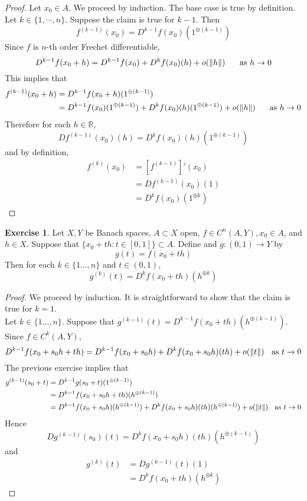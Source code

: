 \documentclass[12pt]{amsart}
\theoremstyle{definition}
\newtheorem{ex}[definition]{Exercise}
\newcommand{\R}{\mathbb{R}}
\newcommand{\lex}[1]{\label{ex:#1}}
\begin{document}
	\begin{proof}
	Let $x_0 \in A$. We proceed by induction. The base case is true by definition. Let $k \in \{1, \cdots, n\}$. Suppose the claim is true for $k-1$. Then $$f^{(k-1)}(x_0) = D^{k-1}f(x_0)(1^{\oplus (k-1)})$$
	Since $f$ is $n$-th order Frechet differentiable, $$D^{k-1}f(x_0+h) = D^{k-1}f(x_0) + D^kf(x_0)(h) + o(\|h\|) \hspace{.5cm} \text{ as } h \rightarrow 0$$ 
	This implies that 
	\begin{align*}
	f^{(k-1)}(x_0+h) 
	&=  D^{k-1}f(x_0+h)(1^{\oplus (k-1)}) \\
	&= D^{k-1}f(x_0)(1^{\oplus (k-1)}) + D^kf(x_0)(h)(1^{\oplus (k-1)}) + o(\|h\|) \hspace{.5cm} \text{ as } h \rightarrow 0
	\end{align*}
	Therefore for each $h \in \R$, $$Df^{(k-1)}(x_0)(h) = D^kf(x_0)(h)(1^{\oplus (k-1)})$$
	and by definition,
	\begin{align*}
	f^{(k)}(x_0) 
	&= [f^{(k-1)}]'(x_0) \\
	&= Df^{(k-1)}(x_0)(1) \\
	&=  D^kf(x_0)(1^{\oplus k})
	\end{align*}
	\end{proof}
	
	
	
	
	\begin{ex} \lex{}
	Let $X,Y$ be Banach spaces, $A \subset X$ open, $f \in C^n(A, Y), x_0 \in A$, and $h \in X$. Suppose that $\{x_0 +th: t \in [0,1]\} \subset A$. Define and $g:(0,1) \rightarrow Y$ by $$g(t) = f(x_0 + th)$$
	Then for each $k \in \{1 \dots, n\}$ and $t \in (0,1)$, $$g^{(k)}(t) = D^kf(x_0 + th)(h^{\oplus k})$$
	\end{ex}
	
	\begin{proof}
	We proceed by induction. It is straightforward to show that the claim is true for $k=1$.\\
	Let $k \in \{1 \dots, n\}$. Suppose that $g^{(k-1)}(t) = D^{k-1}f(x_0 + th)(h^{\oplus (k-1)})$. Since $f \in C^k(A, Y)$, $$D^{k-1}f(x_0 + s_0h + th)= D^{k-1}f(x_0 + s_0h) + D^k f(x_0 + s_0h)(th) + o(\|t\|) \hspace{.2cm} \text{ as }t \rightarrow 0 $$ 
	The previous exercise implies that 
	\begin{align*}
	g^{(k-1)}(s_0 + t)
	&= D^{k-1}g(s_0+t)(1^{\oplus (k-1)}) \\
	&= D^{k-1}f(x_0 + s_0h + th)(h^{\oplus (k-1)}) \\
	&= D^{k-1}f(x_0 + s_0h)(h^{\oplus (k-1)}) + D^kf(x_0 + s_0h)(th)(h^{\oplus (k-1)}) + o(\|t\|) \hspace{.2cm} \text{ as }t \rightarrow 0
	\end{align*}
	Hence $$Dg^{(k-1)}(s_0)(t) = D^kf(x_0 + s_0h)(th)(h^{\oplus (k-1)})$$ 
	and 
	\begin{align*}
	g^{(k)}(t)
	&= Dg^{(k-1)}(t)(1) \\
	&= D^kf(x_0 + th)(h^{\oplus k})
	\end{align*}
	\end{proof}
	
\end{document}

